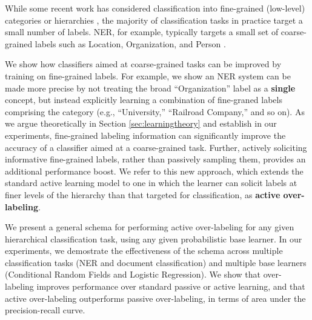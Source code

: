 \documentclass[10pt,conference,compsocconf]{IEEEtran}
\begin{document}
While some recent work has considered classification into fine-grained (low-level) 
categories \cite{fleischman2002fine,ling2012fine}
or hierarchies \cite{yosef2012hyena}, the majority of classification tasks in practice
target a small number of labels.  NER, for example, typically
targets a small set of coarse-grained labels such as Location, Organization,
and Person \cite{finkel2005incorporating}. 

We show how classifiers 
aimed at coarse-grained tasks can be improved by training on fine-grained labels.  For
example, we show an NER system can be made more precise by not
treating the broad ``Organization'' label as a {\bf single} concept, but instead explicitly 
learning a combination of fine-graned labels comprising the category 
(e.g., ``University,'' ``Railroad Company,'' and so on).  As we argue theoretically 
in Section \ref{sec:learningtheory} and establish in our experiments,
fine-grained labeling information can significantly improve the accuracy of a classifier aimed at a 
coarse-grained task.  Further, actively soliciting informative fine-grained labels, rather
than passively sampling them, provides an additional performance boost.  
We refer to this new approach, which extends the standard active
learning model to one in which the learner can solicit labels at finer
levels of the hierarchy than that targeted for classification,
as {\bf active over-labeling}.  


We present a general schema for performing active over-labeling
for any given hierarchical classification task, using
any given probabilistic base learner.  In our experiments, we demostrate
the effectiveness of the schema across multiple classification tasks (NER and document
classification) and multiple base learners (Conditional Random Fields and Logistic Regression).
We show that over-labeling improves performance over standard
passive or active learning, and that active over-labeling outperforms passive
over-labeling, in terms of area under the precision-recall curve.
\end{document}
